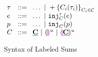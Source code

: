 
\begin{figure}[ht]
  $\arraycolsep=4pt\begin{array}{lll}
      \tau & ::= & \ldots ~\vert~ \tlabeledsum{C_i(\tau_i)}_{C_i \in \C} \\
      e    & ::= & \ldots ~\vert~ \hinj{C}{\tau}{e}                      \\
      p    & ::= & \ldots ~\vert~ \hinjp{C}{p}                           \\
      C    & ::= & \tagC ~\vert~ \tagehole{u} ~\vert~ \taghole{\tagC}{u}
    \end{array}$
  \caption{Syntax of Labeled Sums}
  \label{fig:labeled-sums-syntax}
\end{figure}
